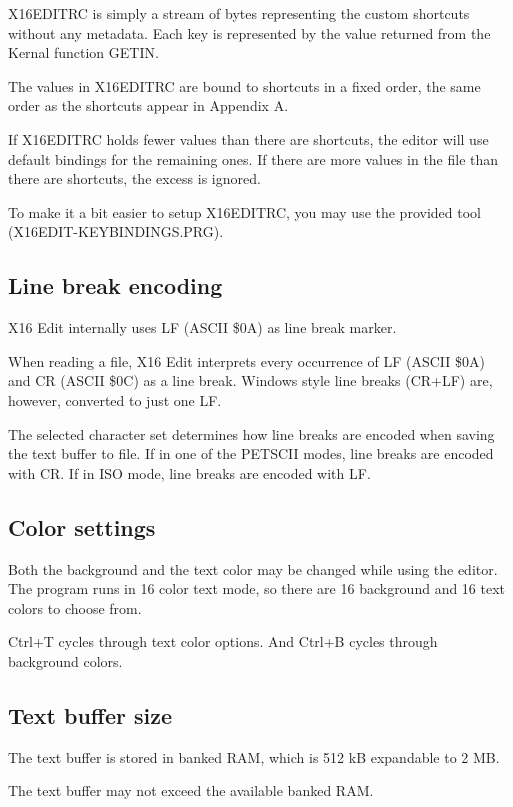 \documentclass{article}
\begin{document}
        X16EDITRC is simply a stream of bytes representing the custom shortcuts without any metadata. 
        Each key is represented by the value returned from the Kernal function GETIN.
        
        The values in X16EDITRC are bound to shortcuts in a fixed order, the same order as
        the shortcuts appear in Appendix A.
        
        If X16EDITRC holds fewer values than there are shortcuts, the editor will use
        default bindings for the remaining ones. If there are more values in the file than there
        are shortcuts, the excess is ignored.
        
        To make it a bit easier to setup X16EDITRC, you may use the provided tool
        (X16EDIT-KEYBINDINGS.PRG).

    \subsection{Line break encoding}
        X16 Edit internally uses LF (ASCII \$0A) as line break marker.

        When reading a file, X16 Edit interprets every occurrence of LF (ASCII \$0A) and CR (ASCII \$0C) as
        a line break. Windows style line breaks (CR+LF) are, however, converted to just one LF.

        The selected character set determines how line breaks are encoded when saving the text buffer
        to file. If in one of the PETSCII modes, line breaks are encoded with CR. If in ISO mode, line
        breaks are encoded with LF.

    \subsection{Color settings}
        Both the background and the text color may be changed while using the editor. 
        The program runs in 16 color text mode, so there are 16 background and 16 text colors to choose from.

        Ctrl+T cycles through text color options.
        And Ctrl+B cycles through background colors.

    \subsection{Text buffer size}
        The text buffer is stored in banked RAM, which is 512 kB expandable to 2 MB.

        The text buffer may not exceed the available banked RAM.
\end{document}

